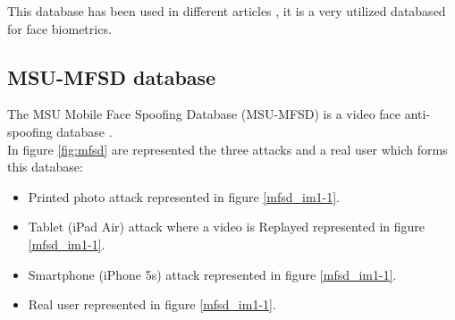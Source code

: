 

This database has been used in different articles \cite{yangLL14,Spoofing_survey,MSUdatabse,LSTM-CNN}, it is a very utilized databased for face biometrics.\\

\subsection{MSU-MFSD database}
The MSU Mobile Face Spoofing Database (MSU-MFSD) is a video face anti-spoofing database \cite{MSUdatabse}.\\

In figure \ref{fig:mfsd} are represented the three attacks and a real user which forms this database:
\begin{itemize}[itemsep=2pt,topsep=8pt,parsep=0pt,partopsep=20pt]
\item Printed photo attack represented in figure \ref{mfsd_im1-1}.
\item Tablet (iPad Air) attack where a video is Replayed represented in figure \ref{mfsd_im1-1}.
\item Smartphone (iPhone 5s) attack represented in figure \ref{mfsd_im1-1}.
\item Real user represented in figure \ref{mfsd_im1-1}.
\end{itemize}

